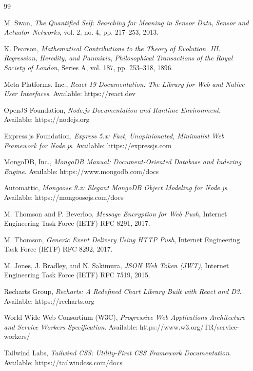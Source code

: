 \documentclass[12pt, a4paper, oneside]{Thesis} %
\begin{document}
\begin{thebibliography}{99}

M. Swan, \textit{The Quantified Self: Searching for Meaning in Sensor Data}, \textit{Sensor and Actuator Networks}, vol. 2, no. 4, pp. 217--253, 2013.

K. Pearson, \textit{Mathematical Contributions to the Theory of Evolution. III. Regression, Heredity, and Panmixia}, \textit{Philosophical Transactions of the Royal Society of London}, Series A, vol. 187, pp. 253--318, 1896.

Meta Platforms, Inc., \textit{React 19 Documentation: The Library for Web and Native User Interfaces}. Available: https://react.dev

OpenJS Foundation, \textit{Node.js Documentation and Runtime Environment}. Available: https://nodejs.org

Express.js Foundation, \textit{Express 5.x: Fast, Unopinionated, Minimalist Web Framework for Node.js}. Available: https://expressjs.com

MongoDB, Inc., \textit{MongoDB Manual: Document-Oriented Database and Indexing Engine}. Available: https://www.mongodb.com/docs

Automattic, \textit{Mongoose 9.x: Elegant MongoDB Object Modeling for Node.js}. Available: https://mongoosejs.com/docs

M. Thomson and P. Beverloo, \textit{Message Encryption for Web Push}, Internet Engineering Task Force (IETF) RFC 8291, 2017.

M. Thomson, \textit{Generic Event Delivery Using HTTP Push}, Internet Engineering Task Force (IETF) RFC 8292, 2017.

M. Jones, J. Bradley, and N. Sakimura, \textit{JSON Web Token (JWT)}, Internet Engineering Task Force (IETF) RFC 7519, 2015.

Recharts Group, \textit{Recharts: A Redefined Chart Library Built with React and D3}. Available: https://recharts.org

World Wide Web Consortium (W3C), \textit{Progressive Web Applications Architecture and Service Workers Specification}. Available: https://www.w3.org/TR/service-workers/

Tailwind Labs, \textit{Tailwind CSS: Utility-First CSS Framework Documentation}. Available: https://tailwindcss.com/docs

\end{thebibliography}
\end{document}
